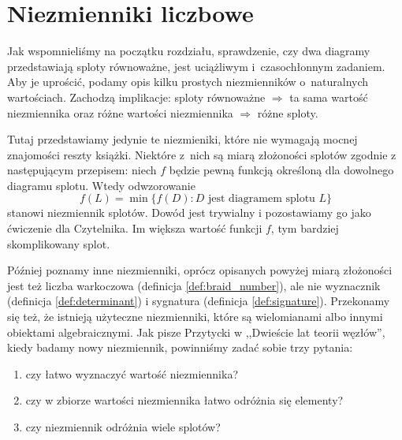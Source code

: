 
\section{Niezmienniki liczbowe}
Jak wspomnieliśmy na początku rozdziału, sprawdzenie,
czy dwa diagramy przedstawiają sploty równoważne,
jest uciążliwym i~czasochłonnym zadaniem.
Aby je uprościć, podamy opis kilku prostych niezmienników o~naturalnych wartościach.
Zachodzą implikacje:
sploty równoważne $\Rightarrow$ ta sama wartość niezmiennika
oraz różne wartości niezmiennika $\Rightarrow$ różne sploty.

Tutaj przedstawiamy jedynie te niezmieniki, które nie wymagają mocnej znajomości reszty książki.
Niektóre z~nich są miarą złożoności splotów zgodnie z następującym przepisem: niech $f$ będzie pewną funkcją określoną dla dowolnego diagramu splotu.
Wtedy odwzorowanie
\begin{equation}
    f(L) = \min \{f(D) : D \text{ jest diagramem splotu } L\}
\end{equation}
stanowi niezmiennik splotów.
Dowód jest trywialny i pozostawiamy go jako ćwiczenie dla Czytelnika.
Im większa wartość funkcji $f$, tym bardziej skomplikowany splot.

Później poznamy inne niezmienniki, oprócz opisanych powyżej miarą złożoności jest też liczba warkoczowa (definicja \ref{def:braid_number}), ale nie wyznacznik (definicja \ref{def:determinant}) i sygnatura (definicja \ref{def:signature}).
Przekonamy się też, że istnieją użyteczne niezmienniki, które są wielomianami albo innymi obiektami algebraicznymi.
Jak pisze Przytycki w  ,,Dwieście lat teorii węzłów'', kiedy badamy nowy niezmiennik, powinniśmy zadać sobie trzy pytania:
\begin{enumerate}
    \item czy łatwo wyznaczyć wartość niezmiennika?
    \item czy w zbiorze wartości niezmiennika łatwo odróżnia się elementy?
    \item czy niezmiennik odróżnia wiele splotów?
\end{enumerate}













